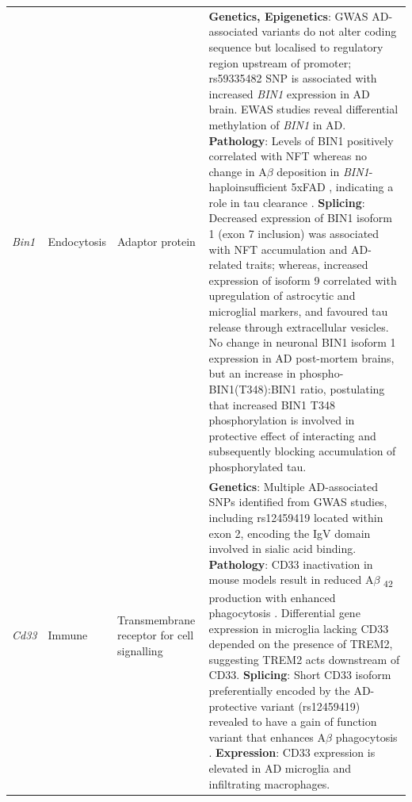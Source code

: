 \begin{landscape}
\begin{longtable}[c]{p{1cm}p{2cm}p{4cm}p{19cm}}
			\centering \textit{Bin1} &
			\centering Endocytosis  &
			\centering Adaptor protein &
			\tabitem \textbf{Genetics, Epigenetics}: GWAS AD-associated variants do not alter coding sequence but localised to regulatory region upstream of promoter; rs59335482 SNP is associated with increased \textit{BIN1} expression in AD brain\cite{Chapuis2013}. \newline
			\tabitem EWAS studies reveal differential methylation of \textit{BIN1} in AD.  \newline
			\tabitem \textbf{Pathology}: Levels of BIN1 positively correlated with NFT whereas no change in A$\beta$ deposition in \textit{BIN1}-haploinsufficient 5xFAD \cite{Andrew2019}, indicating a role in tau clearance \cite{Crotti2019}.\newline 
			\tabitem \textbf{Splicing}: Decreased expression of BIN1 isoform 1 (exon 7 inclusion) was associated with NFT accumulation and AD-related traits\cite{Taga2020}; whereas, increased expression of isoform 9 correlated with upregulation of astrocytic and microglial markers\cite{Taga2020}, and favoured tau release through extracellular vesicles\cite{Crotti2019}. \newline
			\tabitem No change in neuronal BIN1 isoform 1 expression in AD post-mortem brains, but an increase in phospho-BIN1(T348):BIN1 ratio, postulating that increased BIN1 T348 phosphorylation is involved in protective effect of interacting and subsequently blocking accumulation of phosphorylated tau\cite{Sartori2019}. \\
			\hdashline[0.5pt/5pt]
			
			\centering \textit{Cd33} &
			\centering Immune  &
			\centering Transmembrane receptor for cell signalling &
			\tabitem \textbf{Genetics}: Multiple AD-associated SNPs identified from GWAS studies, including  rs12459419\cite{Naj2011,Hollingworth2011,Bertram2008} located within exon 2, encoding the IgV domain involved in sialic acid binding\cite{Malik2013}. \newline
			\tabitem \textbf{Pathology}: CD33 inactivation in mouse models result in reduced A$\beta$ \textsubscript{42} production with enhanced phagocytosis \cite{Griciuc2013}. Differential gene expression in microglia lacking CD33 depended on the presence of TREM2, suggesting TREM2 acts downstream of CD33\cite{Griciuc2019}. \newline			
			\tabitem \textbf{Splicing}: Short CD33 isoform preferentially encoded by the AD-protective variant (rs12459419) revealed to have a gain of function variant that enhances A$\beta$ phagocytosis \cite{Bhattacherjee2021}.\newline		
			\tabitem \textbf{Expression}: CD33 expression is elevated in AD microglia and infiltrating macrophages\cite{Griciuc2013}. \\
			

\end{longtable}
\end{landscape}
